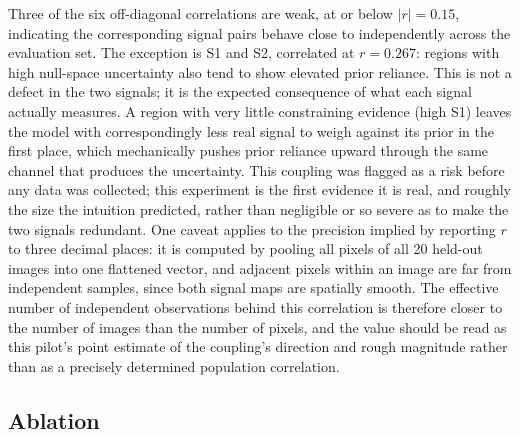 \documentclass[review]{elsarticle}
\begin{document}
Three of the six off-diagonal correlations are weak, at or below $|r|=0.15$, indicating the corresponding signal pairs behave close to independently across the evaluation set. The exception is S1 and S2, correlated at $r=0.267$: regions with high null-space uncertainty also tend to show elevated prior reliance. This is not a defect in the two signals; it is the expected consequence of what each signal actually measures. A region with very little constraining evidence (high S1) leaves the model with correspondingly less real signal to weigh against its prior in the first place, which mechanically pushes prior reliance upward through the same channel that produces the uncertainty. This coupling was flagged as a risk before any data was collected; this experiment is the first evidence it is real, and roughly the size the intuition predicted, rather than negligible or so severe as to make the two signals redundant. One caveat applies to the precision implied by reporting $r$ to three decimal places: it is computed by pooling all pixels of all 20 held-out images into one flattened vector, and adjacent pixels within an image are far from independent samples, since both signal maps are spatially smooth. The effective number of independent observations behind this correlation is therefore closer to the number of images than the number of pixels, and the value should be read as this pilot's point estimate of the coupling's direction and rough magnitude rather than as a precisely determined population correlation.

\subsection{Ablation}
\label{sec:ablation}
\end{document}
